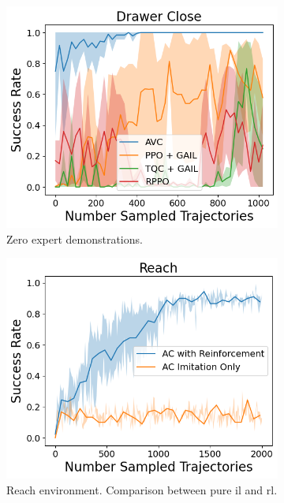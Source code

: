 \begin{figure}[htbp]
\begin{subfigure}[t]{0.32\textwidth}
      \includegraphics[width=\textwidth]{images/0/Drawer Close.png}
      \caption{Zero expert demonstrations.}
      \label{fig:drawerclose}
    \end{subfigure}
    \medskip
    \begin{subfigure}[t]{0.45\textwidth}
      \includegraphics[width=\textwidth]{images/1_2000_imi/Reach.png}
      \caption{Reach environment. Comparison between pure \ac{il} and \ac{rl}.}
    \end{subfigure}
    \hfill
    \begin{subfigure}[t]{0.45\textwidth}

\end{subfigure}
\end{figure}
